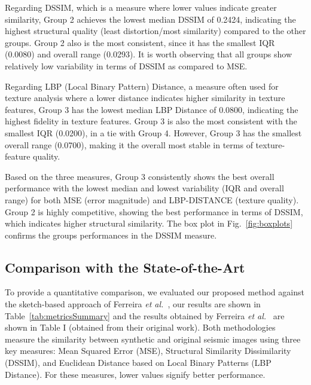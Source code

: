 \documentclass{ieeeaccess}
\begin{document}
Regarding DSSIM, which is a measure where lower values indicate greater similarity, Group 2 achieves the lowest median DSSIM of 0.2424, indicating the highest structural quality (least distortion/most similarity) compared to the other groups. Group 2 also is the most consistent, since it has the smallest IQR (0.0080) and overall range (0.0293). It is worth observing that all groups show relatively low variability in terms of DSSIM as compared to MSE.

Regarding LBP (Local Binary Pattern) Distance, a measure often used for texture analysis where a lower distance indicates higher similarity in texture features, Group 3 has the lowest median LBP Distance of 0.0800, indicating the highest fidelity in texture features. Group 3 is also the most consistent with the smallest IQR (0.0200), in a tie with Group 4. However, Group 3 has the smallest overall range (0.0700), making it the overall most stable in terms of texture-feature quality.

Based on the three measures, Group 3 consistently shows the best overall performance with the lowest median and lowest variability (IQR and overall range) for both MSE (error magnitude) and LBP-DISTANCE (texture quality). Group 2 is highly competitive, showing the best performance in terms of DSSIM, which indicates higher structural similarity. The box plot in Fig.~\ref{fig:boxplots} confirms the groups performances in the DSSIM measure.



\subsection{Comparison with the State-of-the-Art}

To provide a quantitative comparison, we evaluated our proposed method against the sketch-based approach of Ferreira \emph{et al.}~\cite{Ferreira2020}, our results are shown in Table~\ref{tab:metricsSummary} and the results obtained by Ferreira \emph{et al.}~\cite{Ferreira2020} are shown in Table I (obtained from their original work). Both methodologies measure the similarity between synthetic and original seismic images using three key measures: Mean Squared Error (MSE), Structural Similarity Dissimilarity (DSSIM), and Euclidean Distance based on Local Binary Patterns (LBP Distance). For these measures, lower values signify better performance.
\end{document}
